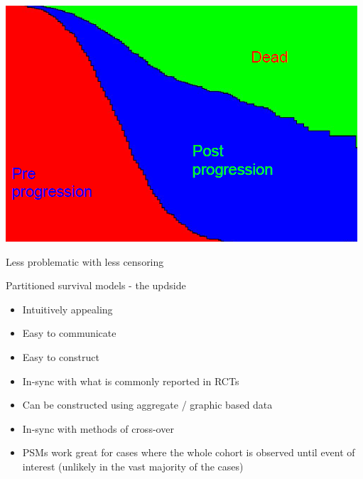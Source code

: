 \documentclass[
  ignorenonframetext,
]{beamer}
\providecommand{\tightlist}{%
  \setlength{\itemsep}{0pt}\setlength{\parskip}{0pt}}
\begin{document}
\begin{frame}

\includegraphics[width=1\linewidth]{figures/psm}

Less problematic with less censoring

\end{frame}

\begin{frame}{Partitioned survival models - the updside}
\protect\hypertarget{partitioned-survival-models---the-updside}{}

\begin{itemize}
\tightlist
\item
  Intuitively appealing
\item
  Easy to communicate
\item
  Easy to construct
\item
  In-sync with what is commonly reported in RCTs
\item
  Can be constructed using aggregate / graphic based data
\item
  In-sync with methods of cross-over
\item
  PSMs work great for cases where the whole cohort is observed until
  event of interest (unlikely in the vast majority of the cases)
\end{itemize}

\end{frame}
\end{document}
